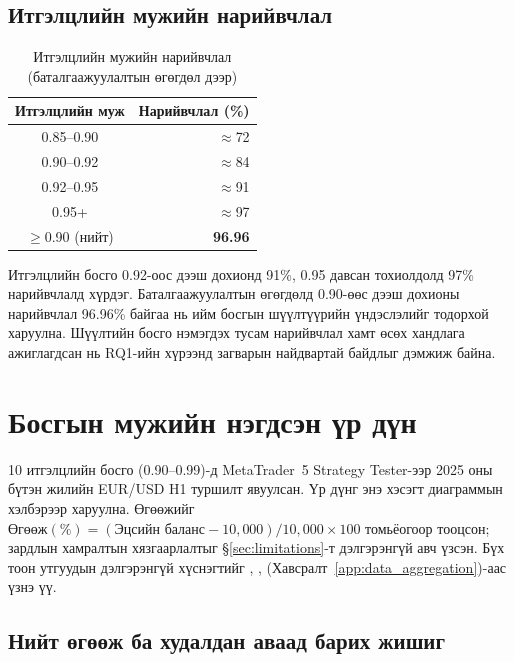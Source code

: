 \subsection{Итгэлцлийн мужийн нарийвчлал}

\begin{table}[H]
\centering
\caption{Итгэлцлийн мужийн нарийвчлал (баталгаажуулалтын өгөгдөл дээр)}
\label{tab:confidence_tier_accuracy}
\renewcommand{\arraystretch}{1.20}
\begin{tabular}{|c|r|}
\hline
\textbf{Итгэлцлийн муж} & \textbf{Нарийвчлал (\%)} \\ \hline
0.85--0.90 & $\approx$72 \\ \hline
0.90--0.92 & $\approx$84 \\ \hline
0.92--0.95 & $\approx$91 \\ \hline
0.95+      & $\approx$97 \\ \hline
$\geq$0.90 (нийт) & \textbf{96.96} \\ \hline
\end{tabular}
\end{table}

Итгэлцлийн босго 0.92-оос дээш дохионд 91\%, 0.95 давсан тохиолдолд 97\% нарийвчлалд хүрдэг. Баталгаажуулалтын өгөгдөлд 0.90-өөс дээш дохионы нарийвчлал 96.96\% байгаа нь ийм босгын шүүлтүүрийн үндэслэлийг тодорхой харуулна. Шүүлтийн босго нэмэгдэх тусам нарийвчлал хамт өсөх хандлага ажиглагдсан нь RQ1-ийн хүрээнд загварын найдвартай байдлыг дэмжиж байна.

\section{Босгын мужийн нэгдсэн үр дүн}
\label{sec:threshold_sweep}

10 итгэлцлийн босго (0.90--0.99)-д MetaTrader~5 Strategy Tester-ээр 2025 оны бүтэн жилийн EUR/USD H1 туршилт явуулсан. Үр дүнг энэ хэсэгт диаграммын хэлбэрээр харуулна. Өгөөжийг $\text{Өгөөж}(\%) = (\text{Эцсийн баланс} - 10{,}000)/10{,}000 \times 100$ томьёогоор тооцсон; зардлын хамралтын хязгаарлалтыг §\ref{sec:limitations}-т дэлгэрэнгүй авч үзсэн. Бүх тоон утгуудын дэлгэрэнгүй хүснэгтийг , ,  (Хавсралт~\ref{app:data_aggregation})-аас үзнэ үү.

\subsection{Нийт өгөөж ба худалдан аваад барих жишиг}

